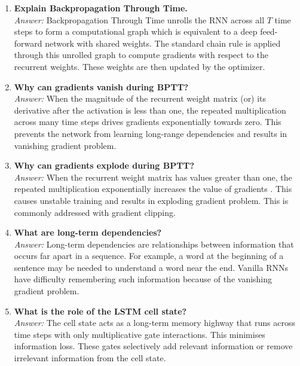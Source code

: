 \documentclass[10pt]{article}
\begin{document}
\begin{enumerate}
\item \textbf{Explain Backpropagation Through Time.}\\
\textit{Answer:} Backpropagation Through Time unrolls the RNN across all $T$ time steps to form a computational graph which is equivalent to a deep feed-forward network with shared weights. The standard chain rule is applied through this unrolled graph to compute gradients with respect to the recurrent weights. These weights are then updated by the optimizer.\\
\vspace{8mm}

\item \textbf{Why can gradients vanish during BPTT?}\\
\textit{Answer:} When the magnitude of the recurrent weight matrix (or) its derivative after the activation is less than one, the repeated multiplication across many time steps drives gradients exponentially towards zero. This prevents the network from learning long-range dependencies and results in vanishing gradient problem.\\
\vspace{8mm}

\item \textbf{Why can gradients explode during BPTT?}\\
\textit{Answer:} When the recurrent weight matrix has values greater than one, the repeated multiplication exponentially increases the value of gradients . This causes unstable training and results in exploding gradient problem. This is commonly addressed with gradient clipping.\\
\vspace{8mm}

\item \textbf{What are long-term dependencies?}\\
\textit{Answer:} Long-term dependencies are relationships between information that occurs far apart in a sequence. For example, a word at the beginning of a sentence may be needed to understand a word near the end. Vanilla RNNs have difficulty remembering such information because of the vanishing gradient problem.\\\vspace{8mm}

\item \textbf{What is the role of the LSTM cell state?}\\
\textit{Answer:} The cell state acts as a long-term memory highway that runs across time steps with only multiplicative gate interactions. This minimises information loss. These gates selectively add relevant information or remove irrelevant information from the cell state.\\
\vspace{8mm}


\end{enumerate}
\end{document}
